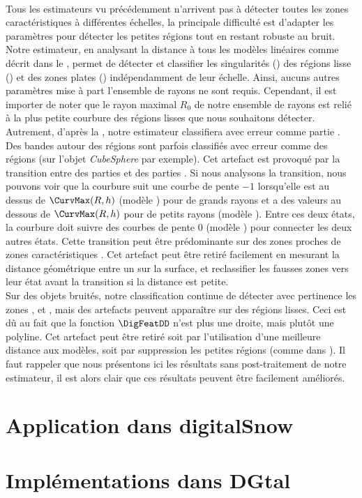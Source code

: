 \paragraph{}
%
Tous les estimateurs vu précédemment n'arrivent pas à détecter toutes les zones
caractéristiques à différentes échelles, la principale difficulté est d'adapter
les paramètres pour détecter les petites régions tout en restant robuste au
bruit. Notre estimateur, en analysant la distance à tous les modèles linéaires
comme décrit dans le ,
permet de détecter et classifier les singularités (\featedge) des régions lisse
(\featsmooth) et des zones plates (\featflat) indépendamment de leur échelle.
Ainsi, aucuns autres paramètres mise à part l'ensemble de rayons ne sont requis.
Cependant, il est importer de noter que le rayon maximal $R_0$ de notre ensemble
de rayons est relié à la plus petite courbure des régions lisses que nous
souhaitons détecter. Autrement, d'après la , notre
estimateur classifiera avec erreur comme partie \featflat.
%
\\
%
Des bandes autour des régions \featedge sont parfois classifiés avec erreur
comme des régions \featsmooth (sur l'objet \emph{CubeSphere} par exemple). Cet
artefact est provoqué par la transition entre des parties \featflat et des
parties \featedge. Si nous analysons la transition, nous pouvons voir que la
courbure suit une courbe de pente $-1$ lorsqu'elle est au dessus de
$\CurvMax(R,h)$ (modèle \featedge) pour de grands rayons et a des valeurs au
dessous de $\CurvMax(R,h)$ pour de petits rayons (modèle \featflat). Entre ces
deux états, la courbure doit suivre des courbes de pente $0$ (modèle
\featsmooth) pour connecter les deux autres états. Cette transition peut être
prédominante sur des zones proches de zones caractéristiques \featedge. Cet
artefact peut être retiré facilement en mesurant la distance géométrique entre
un \featedge sur la surface, et reclassifier les fausses zones \featsmooth vers
leur état avant la transition si la distance est petite.
%
\\
%
Sur des objets bruités, notre classification continue de détecter avec
pertinence les zones \featedge, \featsmooth et \featflat, mais des artefacts
peuvent apparaître sur des régions lisses. Ceci est dû au fait que la fonction
$\DigFeatDD$ n'est plus une droite, mais plutôt une polyline. Cet artefact peut
être retiré soit par l'utilisation d'une meilleure distance aux modèles, soit
par suppression les petites régions \featedge (comme dans \cite{Park2012}). Il
faut rappeler que nous présentons ici les résultats sans post-traitement de
notre estimateur, il est alors clair que ces résultats peuvent être facilement
améliorés.
%
%
\section{Application dans digitalSnow}%
\label{sec:applications:digitalsnow}
%
\section{Implémentations dans DGtal}%
\label{sec:applications:dgtal}
%
